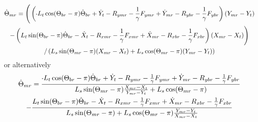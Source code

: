 \documentclass[11pt, landscape]{article}
\newcommand{\mn}{\scalebox{0.7}[1.0]{-}}
\begin{document}
\begin{multline}
\dot{\Theta}_{mr} =
\Bigg( \left(\mn L_{t}\cos(\Theta_{br}-\pi) \dot{\Theta}_{br} +
  \dot{Y}_{t } - R_{ymr} - \frac{1}{\gamma}F_{ymr} + \dot{Y}_{mr} -
  R_{ybr} - \frac{1}{\gamma}F_{ybr} \right) (Y_{mr} - Y_{t })
  \\
  - \left(L_{t}\sin(\Theta_{br}-\pi) \dot{\Theta}_{br} - \dot{X}_{t }
          - R_{xmr} - \frac{1}{\gamma}F_{xmr} + \dot{X}_{mr} - R_{xbr} -
          \frac{1}{\gamma}F_{xbr} \right) (X_{mr} - X_{t })
          \Bigg) \\
/ \left(L_{s}\sin(\Theta_{mr}-\pi)(X_{mr} - X_{t }) + L_{s}\cos(\Theta_{mr}-\pi)(Y_{mr} - Y_{t })\right)
\end{multline}
or alternatively
\begin{multline}
\dot{\Theta}_{mr} =
\frac{ \mn L_{t}\cos(\Theta_{br}-\pi) \dot{\Theta}_{br} +
  \dot{Y}_{t } - R_{ymr} - \frac{1}{\gamma}F_{ymr} + \dot{Y}_{mr} -
  R_{ybr} - \frac{1}{\gamma}F_{ybr}
}{
  L_{s}\sin(\Theta_{mr}-\pi)\frac{X_{mr} - X_{t}}{Y_{mr} - Y_{t }} +
  L_{s}\cos(\Theta_{mr}-\pi)
}
  \\
  - \frac{L_{t}\sin(\Theta_{br}-\pi) \dot{\Theta}_{br} - \dot{X}_{t }
          - R_{xmr} - \frac{1}{\gamma}F_{xmr} + \dot{X}_{mr} - R_{xbr} -
          \frac{1}{\gamma}F_{xbr}
          }{
 L_{s}\sin(\Theta_{mr}-\pi) +
L_{s}\cos(\Theta_{mr}-\pi)\frac{Y_{mr} - Y_{t }}{X_{mr} - X_{t }}
}
\end{multline}
\end{document}
